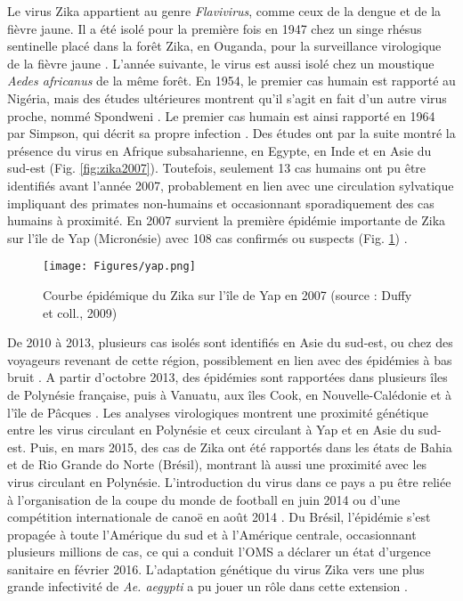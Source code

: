 Le virus Zika appartient au genre {\em Flavivirus}, comme ceux de la dengue et de la fièvre jaune.
Il a été isolé pour la première fois en 1947 chez un singe rhésus sentinelle placé dans la forêt Zika, en Ouganda, pour la surveillance virologique de la fièvre jaune \cite{dick1952zika}.
L'année suivante, le virus est aussi isolé chez un moustique {\em Aedes africanus} de la même forêt.
En 1954, le premier cas humain est rapporté au Nigéria, mais des études ultérieures montrent qu'il s'agit en fait d'un autre virus proche, nommé Spondweni \cite{wikan2016zika}.
Le premier cas humain est ainsi rapporté en 1964 par Simpson, qui décrit sa propre infection \cite{simpson1964zika}.
Des études ont par la suite montré la présence du virus en Afrique subsaharienne, en Egypte, en Inde et en Asie du sud-est (Fig. \ref{fig:zika2007}).
Toutefois, seulement 13 cas humains ont pu être identifiés avant l'année 2007, probablement en lien avec une circulation sylvatique impliquant des primates non-humains et occasionnant sporadiquement des cas humains à proximité.
En 2007 survient la première épidémie importante de Zika sur l'île de Yap (Micronésie) avec 108 cas confirmés ou suspects (Fig. \ref{fig:yap2007}) \cite{duffy_zika_2009}.
\begin{figure}[t]
	\centering
	\texttt{[image: Figures/yap.png]}
	\caption{Courbe épidémique du Zika sur l'île de Yap en 2007 (source : Duffy et coll., 2009)}
	\label{fig:yap2007}
\end{figure}
De 2010 à 2013, plusieurs cas isolés sont identifiés en Asie du sud-est, ou chez des voyageurs revenant de cette région, possiblement en lien avec des épidémies à bas bruit \cite{wikan2016zika}.
A partir d'octobre 2013, des épidémies sont rapportées dans plusieurs îles de Polynésie française, puis à Vanuatu, aux îles Cook, en Nouvelle-Calédonie et à l'île de Pâcques \cite{cao2014zika,wikan2016zika}.
Les analyses virologiques montrent une proximité génétique entre les virus circulant en Polynésie et ceux circulant à Yap et en Asie du sud-est.
Puis, en mars 2015, des cas de Zika ont été rapportés dans les états de Bahia et de Rio Grande do Norte (Brésil), montrant là aussi une proximité avec les virus circulant en Polynésie.
L'introduction du virus dans ce pays a pu être reliée à l'organisation de la coupe du monde de football en juin 2014 ou d'une compétition internationale de canoë en août 2014 \cite{musso_zika_2015}.
Du Brésil, l'épidémie s'est propagée à toute l'Amérique du sud et à l'Amérique centrale, occasionnant plusieurs millions de cas, ce qui a conduit l'OMS a déclarer un état d'urgence sanitaire en février 2016.
L'adaptation génétique du virus Zika vers une plus grande infectivité de {\em Ae. aegypti} a pu jouer un rôle dans cette extension \cite{liu2017evolutionary}.

